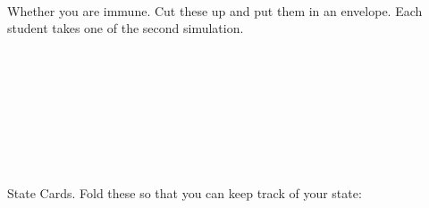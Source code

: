 \documentclass{article}
\begin{document}
\bigskip
\infectCards\\

\bigskip
\infectCards\\

\bigskip
\infectCards\\

\bigskip
\infectCards\\

\bigskip
\infectCards\\

\bigskip
\infectCards\\

\bigskip
\infectCards\\

\bigskip
\infectCards\\

\bigskip
\infectCards\\

\bigskip
\infectCards\\

\bigskip
\infectCards\\

\bigskip
\infectCards\\

\bigskip
\infectCards\\






\newpage

Whether you are immune.  Cut these up and put them in an envelope.  Each student takes one of the second simulation.

\bigskip

\noindent
\immuneCards\\
\bigskip
\immuneCards\\
\bigskip
\immuneCards\\
\bigskip
\immuneCards\\
\bigskip
\immuneCards\\
\bigskip
\immuneCards\\
\bigskip
\immuneCards\\
\bigskip

\newpage
State Cards.  Fold these so that you can keep track of your state:

\newcommand{\stateCard}{
\begin{tikzpicture}
\node[minimum size=2cm] at (-2.1,0)  {\textcolor{black}{\Large Start}};
\node[minimum size=2cm,pink,fill] at (0,0)  {\textcolor{black}{\Large Day 1}};
\node[minimum size=2cm,red,fill] at (0,2.1)  {\textcolor{black}{\Large Day 2}};
\node[minimum size=2cm,gray,fill] at (-2.1,2.1)  {\textcolor{white}{\Large Day 3+}};
\end{tikzpicture}}
\end{document}
